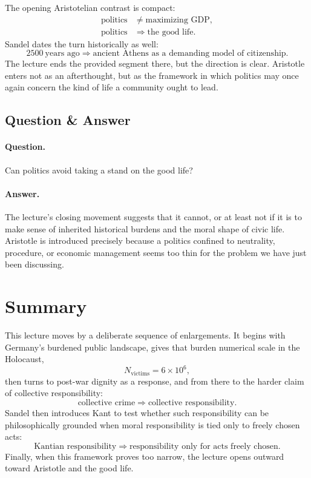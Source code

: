 The opening Aristotelian contrast is compact:
\begin{align}
\text{politics}
&\neq
\text{maximizing GDP},\\
\text{politics}
&\Longrightarrow
\text{the good life}.
\end{align}
Sandel dates the turn historically as well:
\begin{equation}
2500\ \text{years ago}
\Longrightarrow
\text{ancient Athens as a demanding model of citizenship}.
\end{equation}
The lecture ends the provided segment there, but the direction is clear. Aristotle enters not as an afterthought, but as the framework in which politics may once again concern the kind of life a community ought to lead.

\subsection{Question \& Answer}

\paragraph{Question.} Can politics avoid taking a stand on the good life?

\paragraph{Answer.} The lecture's closing movement suggests that it cannot, or at least not if it is to make sense of inherited historical burdens and the moral shape of civic life. Aristotle is introduced precisely because a politics confined to neutrality, procedure, or economic management seems too thin for the problem we have just been discussing.

\section{Summary}

This lecture moves by a deliberate sequence of enlargements. It begins with Germany's burdened public landscape, gives that burden numerical scale in the Holocaust,
\begin{equation}
N_{\text{victims}} = 6 \times 10^6,
\end{equation}
then turns to post-war dignity as a response, and from there to the harder claim of collective responsibility:
\begin{equation}
\text{collective crime}
\Longrightarrow
\text{collective responsibility}.
\end{equation}
Sandel then introduces Kant to test whether such responsibility can be philosophically grounded when moral responsibility is tied only to freely chosen acts:
\begin{equation}
\text{Kantian responsibility}
\Longrightarrow
\text{responsibility only for acts freely chosen}.
\end{equation}
Finally, when this framework proves too narrow, the lecture opens outward toward Aristotle and the good life.

